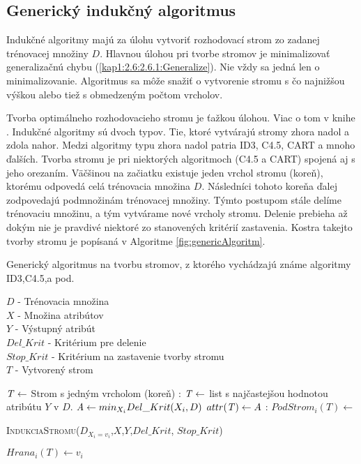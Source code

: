 \subsection{Generický indukčný algoritmus}\label{kap1:2.7:2.7.2:Generic}
Indukčné algoritmy majú za úlohu vytvoriť rozhodovací strom zo zadanej trénovacej množiny $D$. Hlavnou úlohou pri tvorbe stromov je minimalizovať generalizačnú chybu (\ref{kap1:2.6:2.6.1:Generalize}). Nie vždy sa jedná len o minimalizovanie. Algoritmus sa môže snažiť o vytvorenie stromu s čo najnižšou výškou alebo tiež s obmedzeným počtom vrcholov.

Tvorba optimálneho rozhodovacieho stromu je ťažkou úlohou. Viac o tom v knihe \cite[s.51]{kap1-DataMiningForTrees}. Indukčné algoritmy sú dvoch typov. Tie, ktoré vytvárajú stromy zhora nadol a zdola nahor. Medzi algoritmy typu zhora nadol patria ID3, C4.5, CART a mnoho ďalších. Tvorba stromu je pri niektorých algoritmoch (C4.5 a CART) spojená aj s jeho orezaním. Väčšinou na začiatku existuje jeden vrchol stromu (koreň), ktorému odpovedá celá trénovacia množina $D$. Následníci tohoto koreňa ďalej zodpovedajú podmnožinám trénovacej množiny. Týmto postupom stále delíme trénovaciu množinu, a tým vytvárame nové vrcholy stromu. Delenie prebieha až dokým nie je pravdivé niektoré zo stanovených kritérií zastavenia. Kostra takejto tvorby stromu je popísaná v Algoritme  \ref{fig:genericAlgoritm}.

\begin{algorithm} 
\caption{Generický algoritmus na tvorbu stromov, z ktorého vychádzajú známe algoritmy ID3,C4.5,a pod.}\label{fig:genericAlgoritm}
$D$ - Trénovacia množina \\
$X$ - Množina atribútov \\
$Y$ - Výstupný atribút \\
$Del\_Krit$ - Kritérium pre delenie \\
$Stop\_Krit$ - Kritérium na zastavenie tvorby stromu \\
$T$ - Vytvorený strom 
\begin{algorithmic}
\State $\mathit{T} \gets $ Strom s jedným vrcholom (koreň)
:	  
\State $\mathit{T} \gets $ list s najčastejšou hodnotou atribútu $Y$ v $D$.
\Else
\State $\mathit{A} \gets min_{X_{i}}Del\_Krit(X_{i},D)$
\State $attr(\mathit{T}) \gets A$
\EndIf
{}:
\State $PodStrom_{i}(T) \gets $ \parbox[t]{280pt}{\textsc{IndukciaStromu}($D_{X_{i} = v_{i}}$,$X$,$Y$,$Del\_Krit$, $Stop\_Krit$)} 
\State $Hrana_{i}(T) \gets v_{i}$  
\EndFor \\
\EndFunction
\end{algorithmic}
\end{algorithm}

